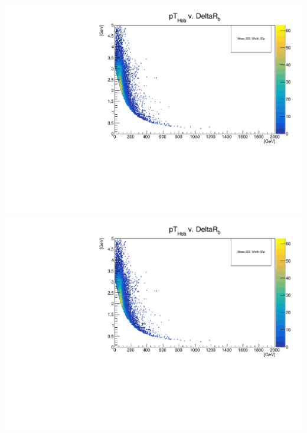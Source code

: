 \documentclass[a4wide,10pt]{article}
\begin{document}
\includegraphics[scale=0.50,page=40]{../Pdfs/2-D_Hbb(pT)_versus_b(DeltaR)_VaryingWidths.pdf}
\includegraphics[scale=0.50,page=41]{../Pdfs/2-D_Hbb(pT)_versus_b(DeltaR)_VaryingWidths.pdf}
\end{document}
